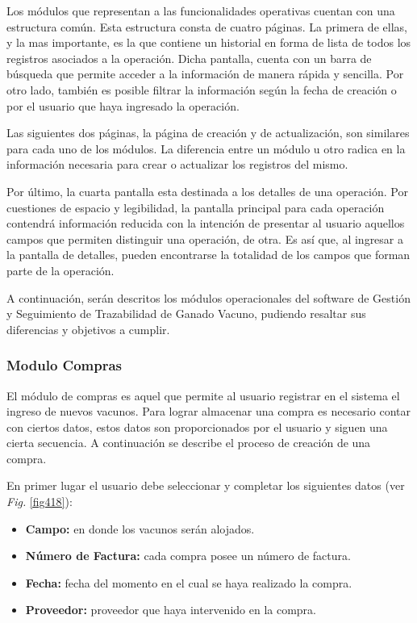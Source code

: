 \documentclass[11pt,oneside]{book}
\begin{document}
Los módulos que representan a las funcionalidades operativas cuentan con una estructura común. Esta estructura consta de cuatro páginas. La primera de ellas, y la mas importante, es la que contiene un historial en forma de lista de todos los registros asociados a la operación. Dicha pantalla, cuenta con un barra de búsqueda que permite acceder a la información de manera rápida y sencilla. Por otro lado, también es posible filtrar la información según la fecha de creación o por el usuario que haya ingresado la operación.

Las siguientes dos páginas, la página de creación y de actualización, son similares para cada uno de los módulos. La diferencia entre un módulo u otro radica en la información necesaria para crear o actualizar los registros del mismo. 

Por último, la cuarta pantalla esta destinada a los detalles de una operación. Por cuestiones de espacio y legibilidad, la pantalla principal para cada operación contendrá información reducida con la intención de presentar al usuario aquellos campos que permiten distinguir una operación, de otra. Es así que, al ingresar a la pantalla de detalles, pueden encontrarse la totalidad de los campos que forman parte de la operación.

A continuación, serán descritos los módulos operacionales del software de Gestión y Seguimiento de Trazabilidad de Ganado Vacuno, pudiendo resaltar sus diferencias y objetivos a cumplir.

\subsubsection{Modulo Compras}
El módulo de compras es aquel que permite al usuario registrar en el sistema el ingreso de nuevos vacunos. Para lograr almacenar una compra es necesario contar con ciertos datos, estos datos son proporcionados por el usuario y siguen una cierta secuencia. A continuación se describe el proceso de creación de una compra.

En primer lugar el usuario debe seleccionar y completar los siguientes datos (ver \textit{Fig.} \eqref{fig418}):
\begin{itemize}
\item \textbf{Campo:} en donde los vacunos serán alojados.
\item \textbf{Número de Factura:} cada compra posee un número de factura.
\item \textbf{Fecha:} fecha del momento en el cual se haya realizado la compra.
\item \textbf{Proveedor:} proveedor que haya intervenido en la compra.
\end{itemize}
\end{document}
